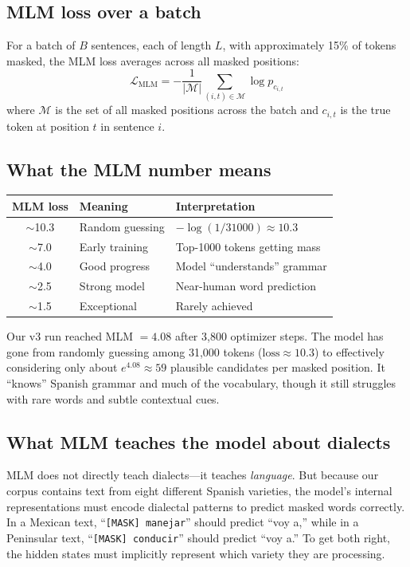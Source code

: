 \documentclass[11pt,a4paper]{article}
\theoremstyle{definition}
\begin{document}
\subsection{MLM loss over a batch}

For a batch of $B$ sentences, each of length $L$, with approximately
15\% of tokens masked, the MLM loss averages across all masked positions:
\[
\mathcal{L}_{\text{MLM}} = -\frac{1}{|\mathcal{M}|}
\sum_{(i,t) \in \mathcal{M}} \log p_{c_{i,t}}
\]
where $\mathcal{M}$ is the set of all masked positions across the
batch and $c_{i,t}$ is the true token at position $t$ in sentence $i$.

\subsection{What the MLM number means}

\begin{center}
\begin{tabular}{cll}
\toprule
\textbf{MLM loss} & \textbf{Meaning} & \textbf{Interpretation} \\
\midrule
$\sim$10.3 & Random guessing & $-\log(1/31000) \approx 10.3$ \\
$\sim$7.0 & Early training & Top-1000 tokens getting mass \\
$\sim$4.0 & Good progress & Model ``understands'' grammar \\
$\sim$2.5 & Strong model & Near-human word prediction \\
$\sim$1.5 & Exceptional & Rarely achieved \\
\bottomrule
\end{tabular}
\end{center}

Our v3 run reached MLM $= 4.08$ after 3,800 optimizer steps. The
model has gone from randomly guessing among 31,000 tokens ($\text{loss}
\approx 10.3$) to effectively considering only about $e^{4.08} \approx
59$ plausible candidates per masked position. It ``knows'' Spanish
grammar and much of the vocabulary, though it still struggles with
rare words and subtle contextual cues.

\subsection{What MLM teaches the model about dialects}

MLM does not directly teach dialects---it teaches \emph{language}.
But because our corpus contains text from eight different Spanish
varieties, the model's internal representations must encode dialectal
patterns to predict masked words correctly. In a Mexican text,
``\texttt{[MASK] manejar}'' should predict ``voy a,'' while in a
Peninsular text, ``\texttt{[MASK] conducir}'' should predict
``voy a.'' To get both right, the hidden states must implicitly
represent which variety they are processing.
\end{document}
